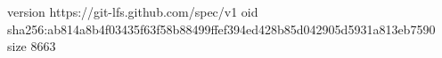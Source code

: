 version https://git-lfs.github.com/spec/v1
oid sha256:ab814a8b4f03435f63f58b88499ffef394ed428b85d042905d5931a813eb7590
size 8663
